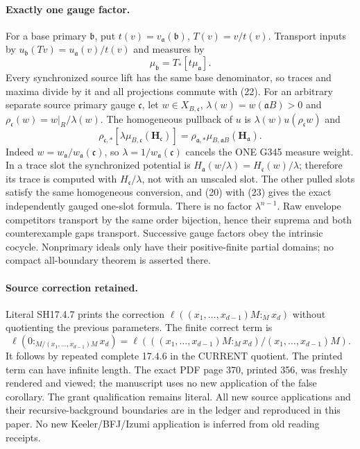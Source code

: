 \paragraph{Exactly one gauge factor.}
For a base primary $\mathfrak b$, put $t(v)=v_{\mathfrak a}(\mathfrak b)$, $T(v)=v/t(v)$. Transport inputs by $u_{\mathfrak b}(Tv)=u_{\mathfrak a}(v)/t(v)$ and measures by
\[
 \mu_{\mathfrak b}=T_*[t\mu_{\mathfrak a}]. \tag{22}
\]
Every synchronized source lift has the same base denominator, so traces and maxima divide by it and all projections commute with (22). For an arbitrary separate source primary gauge $\mathfrak c$, let $w\in X_{B,\mathfrak c}$,
$\lambda(w)=w(\mathfrak aB)>0$ and $\rho_{\mathfrak c}(w)=w|_R/\lambda(w)$. The homogeneous pullback of $u$ is $\lambda(w)u(\rho_{\mathfrak c}w)$ and
\[
 \rho_{\mathfrak c,*}[\lambda\mu_{B,\mathfrak c}(\boldsymbol H_{\mathfrak c})]
 =\rho_{\mathfrak a,*}\mu_{B,\mathfrak aB}(\boldsymbol H_{\mathfrak a}). \tag{23}
\]
Indeed $w=w_{\mathfrak a}/w_{\mathfrak a}(\mathfrak c)$, so $\lambda=1/w_{\mathfrak a}(\mathfrak c)$ cancels the ONE G345 measure weight. In a trace slot the synchronized potential is $H_{\mathfrak a}(w/\lambda)=H_{\mathfrak c}(w)/\lambda$; therefore its trace is computed with $H_{\mathfrak c}/\lambda$, not with an unscaled slot. The other pulled slots satisfy the same homogeneous conversion, and (20) with (23) gives the exact independently gauged one-slot formula. There is no factor $\lambda^{n-1}$. Raw envelope competitors transport by the same order bijection, hence their suprema and both counterexample gaps transport. Successive gauge factors obey the intrinsic cocycle. Nonprimary ideals only have their positive-finite partial domains; no compact all-boundary theorem is asserted there.

\paragraph{Source correction retained.}
Literal SH17.4.7 prints the correction $\ell((x_1,\ldots,x_{d-1})M:_Mx_d)$ without quotienting the previous parameters. The finite correct term is
\[
 \ell(0:_{M/(x_1,\ldots,x_{d-1})M}x_d)
 =\ell\left(((x_1,\ldots,x_{d-1})M:_Mx_d)/(x_1,\ldots,x_{d-1})M\right).
\]
It follows by repeated complete 17.4.6 in the CURRENT quotient. The printed term can have infinite length. The exact PDF page 370, printed 356, was freshly rendered and viewed; the manuscript uses no new application of the false corollary. The grant qualification remains literal. All new source applications and their recursive-background boundaries are in the ledger and reproduced in this paper. No new Keeler/BFJ/Izumi application is inferred from old reading receipts.

